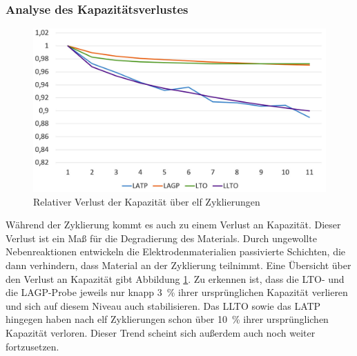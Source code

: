 \documentclass[a4paper, 11pt, headsepline,footsepline,twoside,abstract]{scrbook}
\begin{document}
\subsubsection{Analyse des Kapazitätsverlustes}
\begin{figure}
	\centering
	\includegraphics[width=1.00\columnwidth]{images/kapazitaetsverlust.jpg}
	\caption{Relativer Verlust der Kapazität über elf Zyklierungen}
	\label{kapazitaetsverlust}
\end{figure}
Während der Zyklierung kommt es auch zu einem Verlust an Kapazität. Dieser Verlust ist ein Maß für die Degradierung des Materials. Durch ungewollte Nebenreaktionen entwickeln die Elektrodenmaterialien passivierte Schichten, die dann verhindern, dass Material an der Zyklierung teilnimmt. Eine Übersicht über den Verlust an Kapazität gibt Abbildung \ref{kapazitaetsverlust}. Zu erkennen ist, dass die LTO- und die LAGP-Probe jeweils nur knapp \SI{3}{\percent} ihrer ursprünglichen Kapazität verlieren und sich auf diesem Niveau auch stabilisieren. Das LLTO sowie das LATP hingegen haben nach elf Zyklierungen schon über \SI{10}{\percent} ihrer ursprünglichen Kapazität verloren. Dieser Trend scheint sich außerdem auch noch weiter fortzusetzen.
\end{document}
